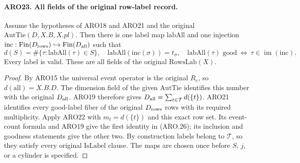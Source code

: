 \paragraph{ARO23. All fields of the original row-label record.}
\label{claim:ARO23}
Assume the hypotheses of ARO18 and ARO21 and the original
\(\mathrm{AutTie}(D,X.B,X.pl)\).  Then there is one label map
\(\mathrm{labAll}\) and one injection
\(\mathrm{inc}:\mathrm{Fin}(D_{\rm rows})\hookrightarrow
\mathrm{Fin}(D_{\rm all})\) such that
\[
 d(S)=\#\{\tau:\mathrm{labAll}(\tau)\in S\},
 \quad \mathrm{labAll}(\mathrm{inc}(\sigma))=t_\sigma,
 \quad \mathrm{labAll}(\tau)\text{ good}\ \Longleftrightarrow\
                           \tau\in\operatorname{im}(\mathrm{inc}).
 \tag{ARO.26}
\]
Every label is valid.  These are all fields of the original
\(\mathrm{RowsLab}(X)\).
\begin{proof}
By ARO15 the universal event operator is the original \(R_e\),
so \(d(\mathrm{all})=X.B.D\).  The dimension field of the given
\(\mathrm{AutTie}\) identifies this number with the original
\(D_{\rm all}\).  ARO19 therefore gives
\(D_{\rm all}=\sum_{t\in\mathcal T}d(\{t\})\).
ARO21 identifies every good-label fiber of the original
\(D_{\rm rows}\) rows with its required multiplicity.
Apply ARO22 with \(m_t=d(\{t\})\) and this exact row set.
Its event-count formula and ARO19 give the first identity in
(ARO.26); its inclusion and goodness statements give the other
two.  By construction labels belong to \(\mathcal T\), so they
satisfy every original \(\mathrm{IsLabel}\) clause.  The maps are
chosen once before \(S\), \(j\), or a cylinder is specified.
\end{proof}


